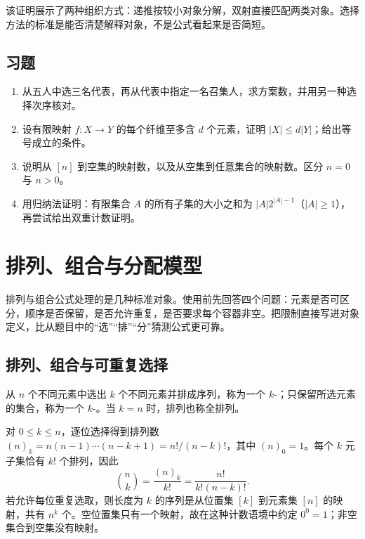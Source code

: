 \documentclass[UTF8,12pt,a4paper,fontset=fandol]{ctexbook}
\begin{document}
该证明展示了两种组织方式：递推按较小对象分解，双射直接匹配两类对象。选择方法的标准是能否清楚解释对象，不是公式看起来是否简短。

\section{习题}
\begin{enumerate}
  \item\label{ex:objects-1} 从五人中选三名代表，再从代表中指定一名召集人，求方案数，并用另一种选择次序核对。
  \item\label{ex:objects-2} 设有限映射 $f:X\to Y$ 的每个纤维至多含 $d$ 个元素，证明 $|X|\le d|Y|$；给出等号成立的条件。
  \item\label{ex:objects-3} 说明从 $[n]$ 到空集的映射数，以及从空集到任意集合的映射数。区分 $n=0$ 与 $n>0$。
  \item\label{ex:objects-4} 用归纳法证明：有限集合 $A$ 的所有子集的大小之和为 $|A|2^{|A|-1}$（$|A|\ge1$），再尝试给出双重计数证明。
\end{enumerate}

\chapter{排列、组合与分配模型}
\label{ch:elementary-counting}

排列与组合公式处理的是几种标准对象。使用前先回答四个问题：元素是否可区分，顺序是否保留，是否允许重复，是否要求每个容器非空。把限制直接写进对象定义，比从题目中的“选”“排”“分”猜测公式更可靠。

\section{排列、组合与可重复选择}

\begin{definition}
从 $n$ 个不同元素中选出 $k$ 个不同元素并排成序列，称为一个 $k$-；只保留所选元素的集合，称为一个 $k$-。当 $k=n$ 时，排列也称全排列。
\end{definition}

对 $0\le k\le n$，逐位选择得到排列数 $(n)_k=n(n-1)\cdots(n-k+1)=n!/(n-k)!$，其中 $(n)_0=1$。每个 $k$ 元子集恰有 $k!$ 个排列，因此
\begin{equation}
  \binom nk=\frac{(n)_k}{k!}=\frac{n!}{k!(n-k)!}.
  \label{eq:binomial-count}
\end{equation}
若允许每位重复选取，则长度为 $k$ 的序列是从位置集 $[k]$ 到元素集 $[n]$ 的映射，共有 $n^k$ 个。空位置集只有一个映射，故在这种计数语境中约定 $0^0=1$；非空集合到空集没有映射。
\end{document}
